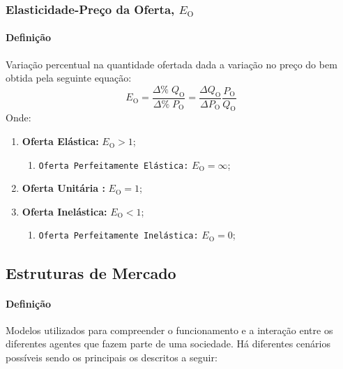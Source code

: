 \documentclass{article}
\begin{document}
        \subsubsection{Elasticidade-Preço da Oferta, $E_{\text{O}}$}
            \paragraph{Definição}Variação percentual na quantidade ofertada dada a variação no preço do bem obtida pela seguinte equação:
                \begin{equation}
                    \boxed{
                        E_{\text{O}} = 
                        \frac{\Delta\%\;Q_{\text{O}}}{\Delta\%\;P_{\text{O}}} = 
                        \frac{\Delta Q_{\text{O}}}{\Delta P_{\text{O}}}\frac{P_{\text{O}}}{Q_{\text{O}}}
                    }
                \end{equation}
            Onde:
                \begin{enumerate}[noitemsep]
                    \item \textbf{Oferta Elástica:} $E_{\text{O}} > 1$;
                        \begin{enumerate}
                            \item \texttt{Oferta Perfeitamente Elástica:} $E_{\text{O}} = \infty$;
                        \end{enumerate}

                    \item \textbf{Oferta Unitária :} $E_{\text{O}} = 1$;

                    \item \textbf{Oferta Inelástica:} $E_{\text{O}} < 1$;
                        \begin{enumerate}
                            \item \texttt{Oferta Perfeitamente Inelástica:} $E_{\text{O}} = 0$;
                        \end{enumerate}
                \end{enumerate}

        \subsection{Estruturas de Mercado}
            \paragraph{Definição}Modelos utilizados para compreender o funcionamento e a interação entre os diferentes agentes que fazem parte de uma sociedade. Há diferentes cenários possíveis sendo os principais os descritos a seguir:
\end{document}
